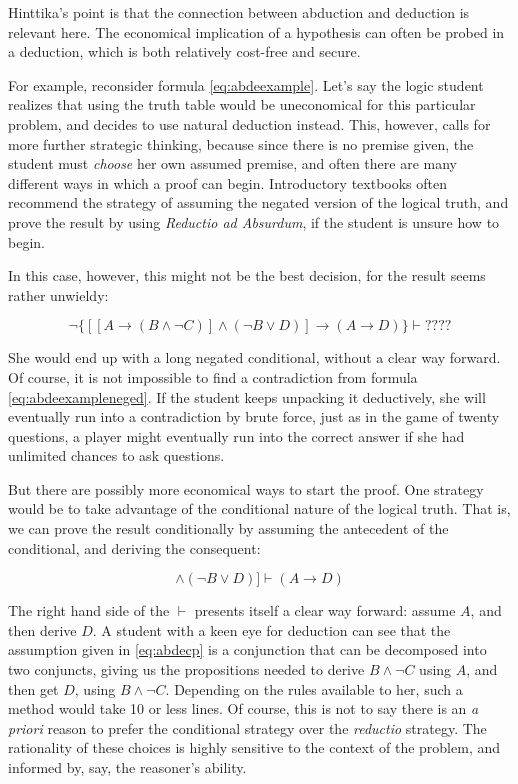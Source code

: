 Hinttika's point is that the connection between abduction and deduction is relevant here. The economical implication of a hypothesis can often be probed in a deduction, which is both relatively cost-free and secure. 

For example, reconsider formula \ref{eq:abdeexample}. Let's say the logic student realizes that using the truth table would be uneconomical for this particular problem, and decides to use natural deduction instead. This, however, calls for more further strategic thinking, because since there is no premise given, the student must \emph{choose} her own assumed premise, and often there are many different ways in which a proof can begin. Introductory textbooks often recommend the strategy of  assuming the negated version of the logical truth, and prove the result by using \emph{Reductio ad Absurdum}, if the student is unsure how to begin.

 In this case, however, this might not be the best decision, for the result seems rather unwieldy:
 
 \begin{equation}
	  \neg \{[[A\to(B\wedge \neg C)] \wedge (\neg B \vee D) ]\to (A\to D)\}\vdash ????
	\label{eq:abdeexampleneged}
\end{equation}

She would end up with a long negated conditional, without a clear way forward. Of course, it is not impossible to find a contradiction from  formula \ref{eq:abdeexampleneged}. If the student keeps unpacking it deductively, she will eventually run into a contradiction by brute force, just as in the game of twenty questions, a player might eventually run into the correct answer if she had unlimited chances to ask questions. 

But there are possibly more economical ways to start the proof.  One strategy would be to take advantage of the conditional nature of the logical truth. That is, we can prove the result conditionally by assuming the antecedent of the conditional, and deriving the consequent:

\begin{equation}
	 [[A\to(B\wedge \neg C)] \wedge (\neg B \vee D) ]\vdash (A\to D)
	\label{eq:abdecp}
\end{equation}

The right hand side of the $\vdash$ presents itself a clear way forward: assume $A$, and then derive $D$.  A student with a keen eye for deduction can see that the assumption given in \ref{eq:abdecp} is a conjunction that can be decomposed into two conjuncts, giving us the propositions needed to derive $B\wedge \neg C$ using $A$, and then get $D$, using $B\wedge \neg C$.  Depending on the rules available to her, such a method would take 10 or less lines. Of course, this is not to say there is an \emph{a priori} reason to prefer the conditional strategy over the \emph{reductio} strategy. The rationality of these choices is highly sensitive to the context of the problem, and informed by, say, the reasoner's ability. 

